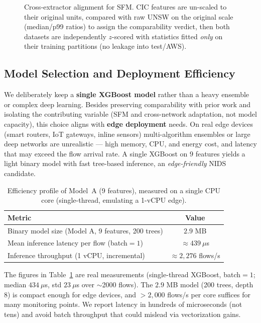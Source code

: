 \documentclass[preprint,12pt,authoryear]{elsarticle}
\begin{document}
\begin{figure}[h]
\centering
\resizebox{0.95\linewidth}{!}{}
\caption{Cross-extractor alignment for SFM. CIC features are un-scaled to their
original units, compared with raw UNSW on the original scale (median/p99 ratios) to
assign the comparability verdict, then both datasets are independently
$z$-scored with statistics fitted \emph{only} on their training partitions
(no leakage into test/AWS).}
\label{fig:unscaling}
\end{figure}

\subsection{Model Selection and Deployment Efficiency}
\label{sec:edge}
We deliberately keep a \textbf{single XGBoost model} rather than a heavy ensemble
or complex deep learning. Besides preserving comparability with prior work and
isolating the contributing variable (SFM and cross-network adaptation, not model
capacity), this choice aligns with \textbf{edge deployment} needs. On real edge
devices (smart routers, IoT gateways, inline sensors) multi-algorithm ensembles or
large deep networks are unrealistic --- high memory, CPU, and energy cost, and
latency that may exceed the flow arrival rate. A single XGBoost on $9$ features
yields a light binary model with fast tree-based inference, an \emph{edge-friendly}
NIDS candidate.

\begin{table}[h]
\centering
\caption{Efficiency profile of Model~A (9 features), measured on a single CPU
core (single-thread, emulating a 1-vCPU edge).}
\label{tab:efficiency}
\begin{tabular}{lc}
\toprule
Metric & Value \\
\midrule
Binary model size (Model A, 9 features, 200 trees) & $2.9$ MB \\
Mean inference latency per flow (batch$=1$) & $\approx 439\ \mu$s \\
Inference throughput (1 vCPU, incremental) & $\approx 2{,}276$ flows/s \\
\bottomrule
\end{tabular}
\end{table}

\noindent The figures in Table~\ref{tab:efficiency} are real measurements
(single-thread XGBoost, batch$=1$; median $434\ \mu$s, std $23\ \mu$s over
$\sim$2000 flows). The $2.9$ MB model (200 trees, depth 8) is compact enough for
edge devices, and $>2{,}000$ flows/s per core suffices for many monitoring points.
We report latency in hundreds of microseconds (not tens) and avoid batch throughput
that could mislead via vectorization gains.
\end{document}
